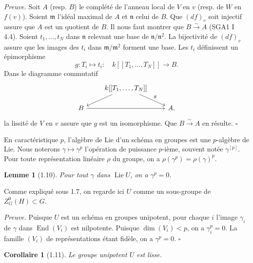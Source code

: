 \documentclass[10pt]{article}
\newcommand{\Lie}{\operatorname{Lie}}
\newcommand{\End}{\operatorname{End}}
\theoremstyle{deligne}
\newtheorem*{lemma*}{Lemme}
\newtheorem*{corollary*}{Corollaire}
\newenvironment{proofdel}{\textit{Preuve.}}{\hfill$\square$}
\begin{document}
\begin{proofdel}
Soit \(A\) (resp. \(B\)) le complété de l'anneau local de \(V\) en \(v\) (resp. de \(W\) en \(f(v)\)). Soient \(\mathfrak m\) l'idéal maximal de \(A\) et \(\mathfrak n\) celui de \(B\). Que \((df)_v\) soit injectif assure que \(A\) est un quotient de \(B\). Il nous faut montrer que \(B\overset{\sim}{\to}A\) (SGA1 I 4.4). Soient \(t_1,\ldots,t_N\) dans \(\mathfrak n\) relevant une base de \(\mathfrak n/\mathfrak n^2\). La bijectivité de \((df)_v\) assure que les images des \(t_i\) dans \(\mathfrak m/\mathfrak m^2\) forment une base. Les \(t_i\) définissent un épimorphisme
\[
  g:T_i\longmapsto t_i:\quad k[[T_1,\ldots,T_N]]\longrightarrow B.
\]
Dans le diagramme commutatif
\[
\begin{tikzcd}[column sep=2.2em,row sep=1.3em]
& k[[T_1,\ldots,T_N]] \arrow[dl] \arrow[dr,"g"] & \\
B \arrow[rr] && A ,
\end{tikzcd}
\]
la lissité de \(V\) en \(v\) assure que \(g\) est un isomorphisme. Que \(B\overset{\sim}{\to}A\) en résulte.
\end{proofdel}

En caractéristique \(p\), l'algèbre de Lie d'un schéma en groupes est une \(p\)-algèbre de Lie. Nous noterons \(\gamma\mapsto\gamma^p\) l'opération de puissance \(p\)-ième, souvent notée \(\gamma^{[p]}\). Pour toute représentation linéaire \(\rho\) du groupe, on a \(\rho(\gamma^p)=\rho(\gamma)^p\).

\begin{lemma*}[1.10]
Pour tout \(\gamma\) dans \(\Lie U\), on a \(\gamma^p=0\).
\end{lemma*}

Comme expliqué sous 1.7, on regarde ici \(U\) comme un sous-groupe de \(Z^0_G(H)\subset G\).

\begin{proofdel}
Puisque \(U\) est un schéma en groupes unipotent, pour chaque \(i\) l'image \(\gamma_i\) de \(\gamma\) dans \(\End(V_i)\) est nilpotente. Puisque \(\dim(V_i)<p\), on a \(\gamma_i^p=0\). La famille \((V_i)\) de représentations étant fidèle, on a \(\gamma^p=0\).
\end{proofdel}

\begin{corollary*}[1.11]
Le groupe unipotent \(U\) est lisse.
\end{corollary*}
\end{document}
